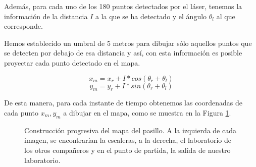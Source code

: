 Además, para cada uno de los 180 puntos detectados por el láser, tenemos la información de la distancia $I$ a la que se ha detectado y el ángulo $\theta_l$ al que corresponde.

Hemos establecido un umbral de 5 metros para dibujar sólo aquellos puntos que se detecten por debajo de esa distancia y así, con esta información es posible proyectar cada punto detectado en el mapa.

\[x_m = x_r + I*cos(\theta_r + \theta_l)\]
\[y_m = y_r + I*sin(\theta_r + \theta_l)\]

De esta manera, para cada instante de tiempo obtenemos las coordenadas de cada punto $x_m, y_m$ a dibujar en el mapa, como se muestra en la Figura \ref{fig:map_pasillo}.

\begin{figure}[!ht]
\centering
    \caption{Construcción progresiva del mapa del pasillo. A la izquierda de cada imagen, se encontrarían la escaleras, a la derecha, el laboratorio de los otros compañeros y en el punto de partida, la salida de nuestro laboratorio.} \label{fig:map_pasillo}
\end{figure}

